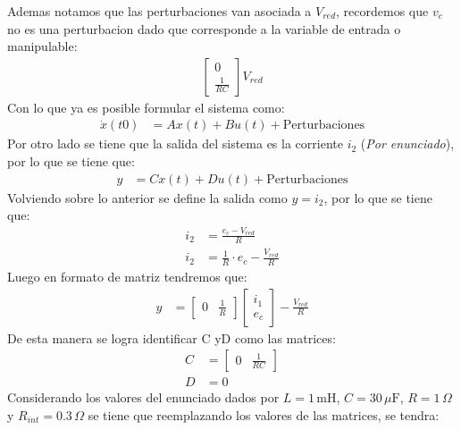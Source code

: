 \documentclass[
  11pt,
  letterpaper,
   addpoints,
   answers
  ]{exam}
\begin{document}
\begin{questions}
\begin{solution}
        Ademas notamos que las perturbaciones van asociada a $V_{red}$, recordemos que $v_{c}$ no es una perturbacion dado que corresponde a la variable de entrada o manipulable:
        \begin{align}
            \begin{bmatrix}
                0\\
                \frac{1}{RC}
            \end{bmatrix}
            V_{red}
        \end{align}
        Con lo que ya es posible formular el sistema como:
        \begin{align}
            \dot{x}(t0) &= Ax(t) + Bu(t) + \text{Perturbaciones} 
        \end{align}
        Por otro lado se tiene que la salida del sistema es la corriente \( i_2 \) (\textit{Por enunciado}), por lo que se tiene que:
        \begin{align}
            y &= Cx(t) + Du(t) + \text{Perturbaciones}
        \end{align}
        Volviendo sobre lo anterior se define la salida como \( y = i_{2} \), por lo que se tiene que:
        \begin{align}
            i_{2} &= \frac{e_{c} - V_{red}}{R}\\
            i_{2} &= \frac{1}{R} \cdot e_{c} - \frac{V_{red}}{R}
        \end{align}
        Luego en formato de matriz tendremos que:
        \begin{align}
            y &=
            \begin{bmatrix}
                0 & \frac{1}{R}
            \end{bmatrix}
            \begin{bmatrix}
                i_{1}\\
                e_{c}
            \end{bmatrix}
            -\frac{V_{red}}{R}
        \end{align}
        De esta manera se logra identificar C yD como las matrices:
        \begin{align}
            C &=
            \begin{bmatrix}
                0 & \frac{1}{RC}
            \end{bmatrix}\\
            D &= 0
        \end{align}
        Considerando los valores del enunciado dados por \( L = 1\,\text{mH} \), \( C = 30\,\mu\text{F} \), \( R = 1\,\Omega \) y \( R_{int} = 0.3\,\Omega \) se tiene que reemplazando los valores de las matrices, se tendra:

\end{solution}
\end{questions}
\end{document}
